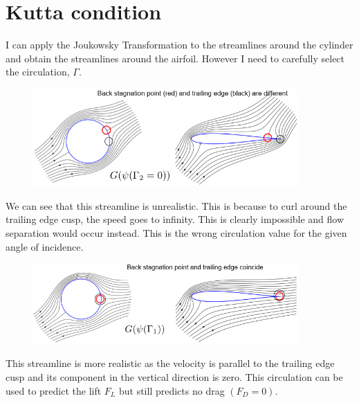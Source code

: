 \documentclass[class=report, crop=false, 12pt,a4paper]{standalone}
\begin{document}
\section{Kutta condition}
I can apply the Joukowsky Transformation to the streamlines around the cylinder and obtain the streamlines around the airfoil. However I need to carefully select the circulation, $\Gamma$.
\begin{figure}[H]
  \centering
  \includegraphics[width = 0.9\textwidth]{../img/diagram38.png}
\end{figure}
We can see that this streamline is unrealistic. This is because to curl around the trailing edge cusp, the speed goes to infinity. This is clearly impossible and flow separation would occur instead. This is the wrong circulation value for the given angle of incidence.
\begin{figure}[H]
  \centering
  \includegraphics[width = 0.9\textwidth]{../img/diagram39.png}
\end{figure}
This streamline is more realistic as the velocity is parallel to the trailing edge cusp and its component in the vertical direction is zero. This circulation can be used to predict the lift $F_L$ but still predicts no drag $(F_D = 0)$.
\end{document}
